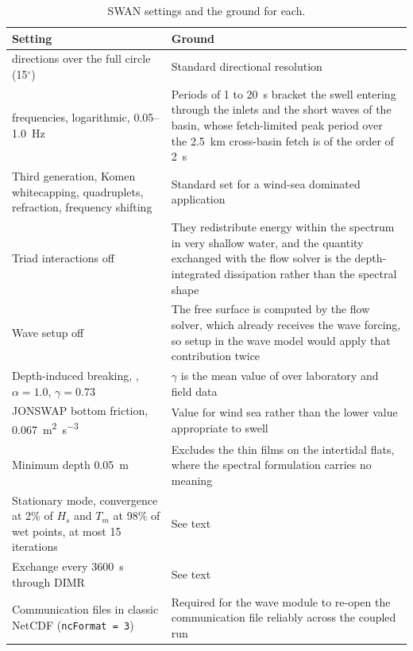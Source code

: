 \documentclass[12pt]{article}
\begin{document}
\begin{table}[H]
  \centering
  \caption{SWAN settings and the ground for each.}
  \label{tab:swan}
  \footnotesize
  \renewcommand{\arraystretch}{1.0}
  \begin{tabular}{>{\raggedright\arraybackslash}p{}>{\raggedright\arraybackslash}p{}}
    \toprule
    Setting & Ground \\
    \midrule
    24 directions over the full circle (15$^\circ$) & Standard directional resolution \\
    \addlinespace[2pt]
    24 frequencies, logarithmic, 0.05--1.0~Hz & Periods of 1 to 20~s bracket the swell entering through the inlets and the short waves of the basin, whose fetch-limited peak period over the 2.5~km cross-basin fetch is of the order of 2~s \\
    \addlinespace[2pt]
    Third generation, Komen whitecapping, quadruplets, refraction, frequency shifting & Standard set for a wind-sea dominated application \\
    \addlinespace[2pt]
    Triad interactions off & They redistribute energy within the spectrum in very shallow water, and the quantity exchanged with the flow solver is the depth-integrated dissipation rather than the spectral shape \\
    \addlinespace[2pt]
    Wave setup off & The free surface is computed by the flow solver, which already receives the wave forcing, so setup in the wave model would apply that contribution twice \\
    \addlinespace[2pt]
    Depth-induced breaking, \citet{BattjesJanssen1978}, $\alpha = 1.0$, $\gamma = 0.73$ & $\gamma$ is the mean value of \citet{BattjesStive1985} over laboratory and field data \\
    \addlinespace[2pt]
    JONSWAP bottom friction, 0.067~\si{\metre\squared\per\cubic\second} & Value for wind sea rather than the lower value appropriate to swell \citep{BouwsKomen1983} \\
    \addlinespace[2pt]
    Minimum depth 0.05~m & Excludes the thin films on the intertidal flats, where the spectral formulation carries no meaning \\
    \addlinespace[2pt]
    Stationary mode, convergence at 2\% of $H_s$ and $T_m$ at 98\% of wet points, at most 15 iterations & See text \\
    \addlinespace[2pt]
    Exchange every 3600~s through DIMR & See text \\
    \addlinespace[2pt]
    Communication files in classic NetCDF (\texttt{ncFormat = 3}) & Required for the wave module to re-open the communication file reliably across the coupled run \\
    \bottomrule
  \end{tabular}
\end{table}
\end{document}
